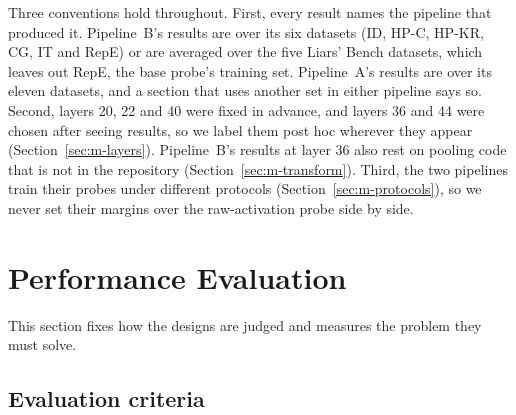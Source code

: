 Three conventions hold throughout.
First, every result names the pipeline that produced it.
Pipeline~B's results are over its six datasets (ID, HP-C, HP-KR, CG, IT and RepE) or are averaged over the five Liars' Bench datasets, which leaves out RepE, the base probe's training set. %
Pipeline~A's results are over its eleven datasets, and a section that uses another set in either pipeline says so. %
Second, layers 20, 22 and 40 were fixed in advance, and layers 36 and 44 were chosen after seeing results, so we label them post hoc wherever they appear (Section~\ref{sec:m-layers}). %
Pipeline~B's results at layer 36 also rest on pooling code that is not in the repository (Section~\ref{sec:m-transform}). %
Third, the two pipelines train their probes under different protocols (Section~\ref{sec:m-protocols}), so we never set their margins over the raw-activation probe side by side. %

\section{Performance Evaluation}
\label{sec:r-perf}

This section fixes how the designs are judged and measures the problem they must solve.

\subsection{Evaluation criteria}
\label{sec:r-criteria}

